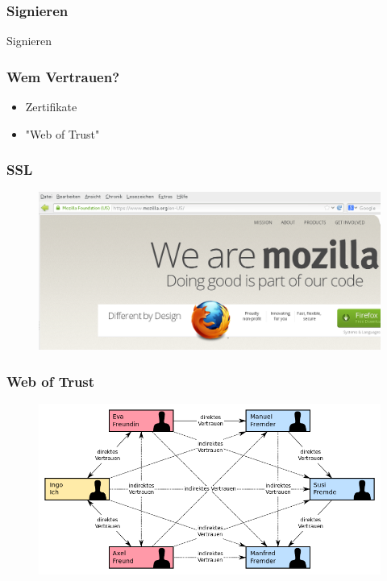 \documentclass[12pt]{beamer}
\begin{document}
\begin{frame}
\frametitle{Signieren}
\begin{center}\Large
Signieren
\end{center}
\end{frame}

\begin{frame}
\frametitle{Wem Vertrauen?}
\begin{itemize}[<+->]
  \item Zertifikate
  \item "Web of Trust"
\end{itemize}
\end{frame}

\begin{frame}
\frametitle{SSL}
\begin{figure}
  \includegraphics[height=0.7\textheight]{img/ssl.png}
\end{figure}
\end{frame}

\begin{frame}
\frametitle{Web of Trust}
\begin{figure}
  \includegraphics[height=0.7\textheight]{img/weboftrust.png}
\end{figure}
\end{frame}
\end{document}
